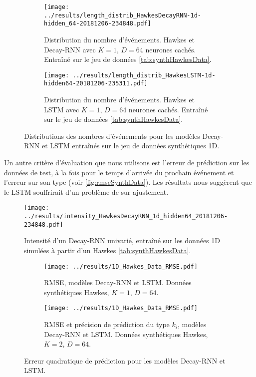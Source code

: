 \documentclass[../main.tex]{subfiles}
\begin{document}
\begin{figure}[ht]
	\begin{subfigure}{\linewidth}
		\texttt{[image: ../results/length\_distrib\_HawkesDecayRNN-1d-hidden\_64-20181206-234848.pdf]}
		\caption{Distribution du nombre d'événements. Hawkes et Decay-RNN avec $K=1$, $D=64$ neurones cachés. Entraîné sur le jeu de données \autoref{tab:synthHawkesData}.}\label{fig:1DRNNlengthDistrib}
	\end{subfigure}
	\begin{subfigure}{\linewidth}
		\texttt{[image: ../results/length\_distrib\_HawkesLSTM-1d-hidden64-20181206-235311.pdf]}
		\caption{Distribution du nombre d'événements. Hawkes et LSTM avec $K=1$, $D=64$ neurones cachés. Entraîné sur le jeu de données \autoref{tab:synthHawkesData}.}\label{fig:1DLSTMlengthDistrib}	
	\end{subfigure}
	\caption{Distributions des nombres d'événements pour les modèles Decay-RNN et LSTM entraînés sur le jeu de données synthétiques 1D.}\label{fig:1DlengthDistrib}
\end{figure}

Un autre critère d'évaluation que nous utilisons est l'erreur de prédiction sur les données de test, à la fois pour le temps d'arrivée du prochain événement et l'erreur sur son type (voir \autoref{fig:rmseSynthData}). Les résultats nous suggèrent que le LSTM souffrirait d'un problème de sur-ajustement.

\begin{figure}[ht]
	\texttt{[image: ../results/intensity\_HawkesDecayRNN\_1d\_hidden64\_20181206-234848.pdf]}
	\caption{Intensité d'un Decay-RNN univarié, entraîné sur les données 1D simulées à partir d'un Hawkes \autoref{tab:synthHawkesData}.}\label{fig:1DRNNintensityPlot}
\end{figure}

\begin{figure}
	\centering
	\begin{subfigure}{0.47\linewidth}
		\centering
		\texttt{[image: ../results/1D\_Hawkes\_Data\_RMSE.pdf]}
		\caption{RMSE, modèles Decay-RNN et LSTM. Données synthétiques Hawkes, $K=1$, $D=64$.}\label{fig:rmse1DhawkesData}	
	\end{subfigure}
	\begin{subfigure}{0.47\linewidth}
		\centering
		\texttt{[image: ../results/1D\_Hawkes\_Data\_RMSE.pdf]}
		\caption{RMSE et précision de prédiction du type $k_i$, modèles Decay-RNN et LSTM. Données synthétiques Hawkes, $K=2$, $D=64$.}\label{fig:rmse2DhawkesData}	
	\end{subfigure}
	\caption{Erreur quadratique de prédiction pour les modèles Decay-RNN et LSTM.}\label{fig:rmseSynthData}
\end{figure}
\end{document}
